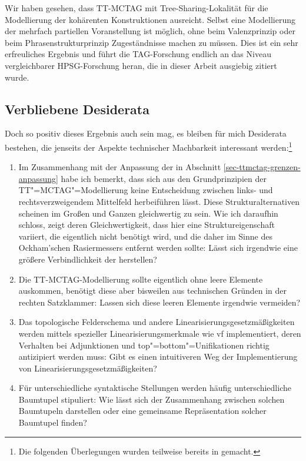 Wir haben gesehen, dass TT-MCTAG mit Tree-Sharing-Lokalität für die Modellierung der  kohärenten Konstruktionen ausreicht. Selbst eine Modellierung der mehrfach partiellen Voranstellung ist möglich, ohne beim Valenzprinzip oder beim Phrasenstrukturprinzip Zugeständnisse machen zu müssen. Dies ist ein sehr erfreuliches Ergebnis und führt die TAG-Forschung endlich an das Niveau vergleichbarer HPSG-Forschung heran, die in dieser Arbeit ausgiebig zitiert wurde.

\subsection{Verbliebene Desiderata}

Doch so positiv dieses Ergebnis auch sein mag, es bleiben für mich Desiderata bestehen, die jenseits der Aspekte technischer Machbarkeit interessant werden:\footnote{Die folgenden Überlegungen wurden teilweise bereits in \cite{Lichte:10} gemacht.}
\begin{enumerate}\label{enum-ttmctag-spinal}
  \item Im Zusammenhang mit der Anpassung der  in Abschnitt \ref{sec-ttmctag-grenzen-anpassung} habe ich bemerkt, dass sich aus den Grundprinzipien der TT"=MCTAG"=Modellierung keine Entscheidung zwischen links- und rechtsverzweigendem Mittelfeld herbeiführen lässt. Diese Strukturalternativen scheinen im Großen und Ganzen gleichwertig zu sein. Wie ich daraufhin schloss, zeigt deren Gleichwertigkeit, dass hier eine Struktureigenschaft variiert, die eigentlich nicht benötigt wird, und die daher im Sinne des Ockham'schen Rasiermessers entfernt werden sollte: Lässt sich irgendwie eine grö\ss ere Verbindlichkeit der  herstellen?
  \item Die TT-MCTAG-Modellierung sollte eigentlich ohne leere Elemente auskommen, benötigt diese aber bisweilen aus  technischen Gründen in der rechten Satzklammer: Lassen sich diese leeren Elemente irgendwie vermeiden?
  \item Das topologische Felderschema und andere Linearisierungsgesetzmä\ss igkeiten werden mittels spezieller Linearisierungsmerkmale wie {\sc vf} implementiert, deren Verhalten bei Adjunktionen und {\sc top}"={\sc bottom}"=Unifikationen richtig antizipiert werden muss:  Gibt es einen intuitiveren Weg der Implementierung von Linearisierungsgesetzmä\ss igkeiten?
  \item Für unterschiedliche syntaktische Stellungen werden häufig unterschiedliche Baumtupel stipuliert: Wie lässt sich der Zusammenhang zwischen solchen Baumtupeln darstellen oder eine gemeinsame Repräsentation solcher Baumtupel finden? 
\end{enumerate} 

